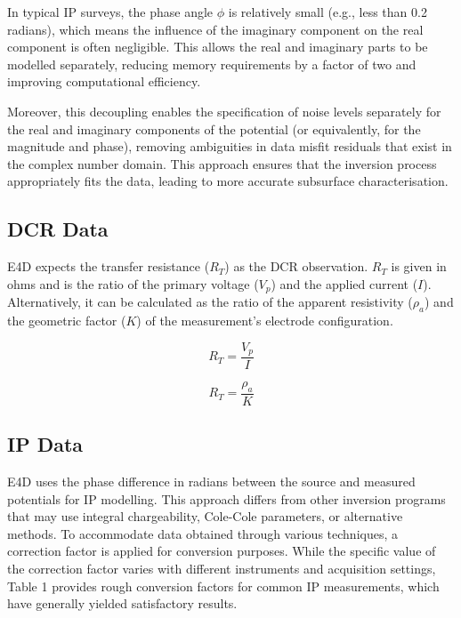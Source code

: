 \documentclass[a4paper,12pt]{article}
\begin{document}
In typical IP surveys, the phase angle \( \phi \) is relatively small (e.g.,
less than 0.2 radians), which means the influence of the imaginary component on
the real component is often negligible. This allows the real and imaginary
parts to be modelled separately, reducing memory requirements by a factor of
two and improving computational efficiency.

Moreover, this decoupling enables the specification of noise levels separately
for the real and imaginary components of the potential (or equivalently, for
the magnitude and phase), removing ambiguities in data misfit residuals that
exist in the complex number domain. This approach ensures that the inversion
process appropriately fits the data, leading to more accurate subsurface
characterisation.

\subsection{DCR Data}

E4D expects the transfer resistance ($R_T$) as the DCR observation. $R_T$ is
given in ohms and is the ratio of the primary voltage ($V_p$) and the applied
current ($I$). Alternatively, it can be calculated as the ratio of the apparent
resistivity ($\rho_a$) and the geometric factor ($K$) of the measurement's
electrode configuration.

\begin{equation}
    R_T = \frac{V_p}{I}
\end{equation}

\begin{equation}
    R_T = \frac{\rho_a}{K}
\end{equation}

\subsection{IP Data}

E4D uses the phase difference in radians between the source and measured
potentials for IP modelling. This approach differs from other inversion
programs that may use integral chargeability, Cole-Cole parameters, or
alternative methods. To accommodate data obtained through various techniques, a
correction factor is applied for conversion purposes. While the specific value
of the correction factor varies with different instruments and acquisition
settings, Table 1 provides rough conversion factors for common IP measurements,
which have generally yielded satisfactory results.
\end{document}
